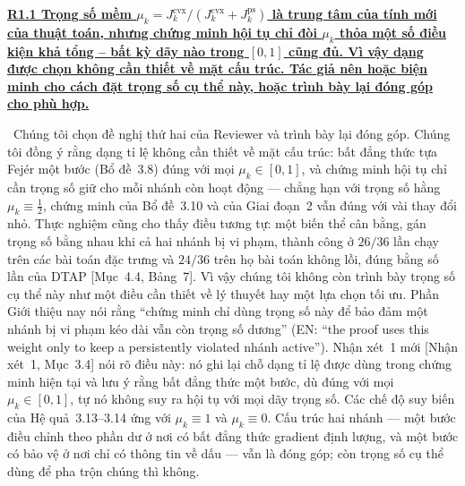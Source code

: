 \documentclass[11pt]{article}
\newcommand{\response}[1]{\smallskip\noindent{\color{blue!60!black}\textbf{Trả lời.}}\ #1\par\medskip}
\newcommand{\loc}[1]{\textcolor{blue!50!black}{[#1]}}
\newcommand{\en}[1]{{\color{gray}\small(EN: ``#1'')}}
\newenvironment{point}[1]{\medskip\noindent\textbf{\uline{#1}}\par}{\par}
\begin{document}
\begin{point}{R1.1 Trọng số mềm $\mu_k=J_k^{\mathrm{cvx}}/(J_k^{\mathrm{cvx}}+J_k^{\mathrm{ps}})$
là trung tâm của tính mới của thuật toán, nhưng chứng minh hội tụ chỉ đòi $\mu_k$
thỏa một số điều kiện khả tổng -- bất kỳ dãy nào trong $[0,1]$ cũng đủ. Vì vậy dạng
được chọn không cần thiết về mặt cấu trúc. Tác giả nên hoặc biện minh cho cách đặt trọng số
cụ thể này, hoặc trình bày lại đóng góp cho phù hợp.}
\response{Chúng tôi chọn đề nghị thứ hai của Reviewer và trình bày lại đóng góp.
Chúng tôi đồng ý rằng dạng tỉ lệ không cần thiết về mặt cấu trúc: bất đẳng thức
tựa Fej\'er một bước (Bổ đề~3.8) đúng với mọi $\mu_k\in[0,1]$, và chứng minh
hội tụ chỉ cần trọng số giữ cho mỗi nhánh còn hoạt động --- chẳng hạn với trọng số hằng
$\mu_k\equiv\tfrac12$, chứng minh của Bổ đề~3.10 và của Giai đoạn~2 vẫn đúng với
vài thay đổi nhỏ. Thực nghiệm cũng cho thấy điều tương tự: một biến thể cân bằng, gán
trọng số bằng nhau khi cả hai nhánh bị vi phạm, thành công ở $26/36$ lần chạy trên các bài toán
đặc trưng và $24/36$ trên họ bài toán không lồi, đúng bằng số lần của DTAP \loc{Mục~4.4,
Bảng~7}. Vì vậy chúng tôi không còn trình bày trọng số cụ thể này như một điều cần thiết về lý thuyết hay
một lựa chọn tối ưu. Phần Giới thiệu nay nói rằng ``chứng minh chỉ dùng trọng số này để bảo đảm một
nhánh bị vi phạm kéo dài vẫn còn trọng số dương'' \en{the proof uses this weight only to keep a
persistently violated nhánh active}. Nhận xét~1 mới \loc{Nhận xét~1, Mục~3.4} nói rõ điều này: nó ghi lại chỗ
dạng tỉ lệ được dùng trong chứng minh hiện tại và lưu ý rằng bất đẳng thức một bước,
dù đúng với mọi $\mu_k\in[0,1]$, tự nó không suy ra hội tụ với mọi
dãy trọng số. Các chế độ suy biến của Hệ quả~3.13--3.14 ứng với
$\mu_k\equiv1$ và $\mu_k\equiv0$. Cấu trúc hai nhánh
--- một bước điều chỉnh theo phần dư ở nơi có bất đẳng thức gradient định lượng,
và một bước có bảo vệ ở nơi chỉ có thông tin về dấu --- vẫn là
đóng góp; còn trọng số cụ thể dùng để pha trộn chúng thì không.}
\end{point}
\end{document}
